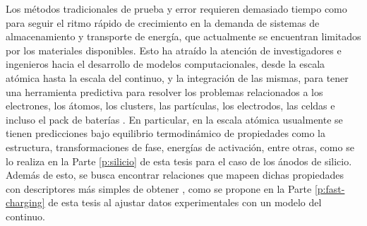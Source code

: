Los métodos tradicionales de prueba y error requieren demasiado tiempo como 
para seguir el ritmo rápido de crecimiento en la demanda de sistemas de 
almacenamiento y transporte de energía, que actualmente se encuentran limitados por los
materiales disponibles. Esto ha atraído la atención de investigadores e ingenieros 
hacia el desarrollo de modelos computacionales, desde la escala atómica hasta la 
escala del continuo, y la integración de las mismas, para tener una herramienta 
predictiva para resolver los problemas relacionados a los electrones, los átomos, 
los clusters, las partículas, los electrodos, las celdas e incluso el pack de 
baterías \cite{shi2016}. En particular, en la escala atómica usualmente se tienen
predicciones bajo equilibrio termodinámico de propiedades como la estructura, 
transformaciones de fase, energías de activación, entre otras, como se lo realiza
en la Parte \ref{p:silicio} de esta tesis para el caso de los ánodos de silicio. 
Además de esto, se busca encontrar relaciones que mapeen dichas propiedades con 
descriptores más simples de obtener \cite{juan2021}, como se propone en la Parte
\ref{p:fast-charging} de esta tesis al ajustar datos experimentales con un modelo
del continuo.
